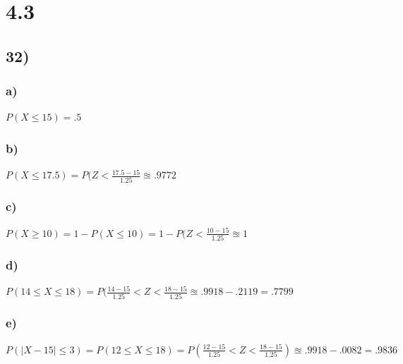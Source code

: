 \documentclass{article}
\begin{document}
\section*{4.3}
	\subsection*{32)}
		\subsubsection*{a)}
			$P(X \leq 15) = .5$
		\subsubsection*{b)}
			$P(X \leq 17.5) = P(Z < \frac{17.5-15}{1.25} \approxeq .9772 $
		\subsubsection*{c)}
			$P(X \geq 10) = 1 - P(X \leq 10) = 1- P(Z < \frac{10-15}{1.25} \approxeq 1$
		\subsubsection*{d)}
			$P(14 \leq X \leq 18) = P(\frac{14-15}{1.25} < Z < \frac{18-15}{1.25} \approxeq .9918 - .2119 = .7799$
		\subsubsection*{e)}
			$P(|X-15| \leq 3) = P(12 \leq X \leq 18) = P(\frac{12-15}{1.25} < Z < \frac{18-15}{1.25}) \approxeq .9918 - .0082 = .9836$
			
\end{document}
